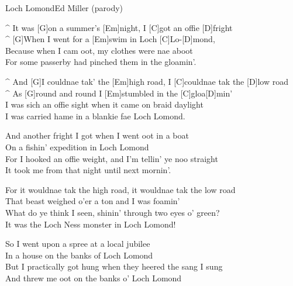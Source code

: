 \vspace{-5mm}
\begin{song}{Loch Lomond}{Ed Miller (parody)}

\vspace{-5mm}
\begin{guitar}
^ It was [G]on a summer's [Em]night, I [C]got an offie [D]fright\\
^ [G]When I went for a [Em]swim in Loch [C]Lo-[D]mond,\\
Because when I cam oot, my clothes were nae aboot\\
For some passerby had pinched them in the gloamin'.\\
\end{guitar}

\begin{guitar}
^ And [G]I couldnae tak' the [Em]high road, I [C]couldnae tak the [D]low road\\
^ As [G]round and round I [Em]stumbled in the [C]gloa[D]min'\\
I was sich an offie sight when it came on braid daylight\\
I was carried hame in a blankie fae Loch Lomond.\\
\end{guitar}


\begin{guitar}
And another fright I got when I went oot in a boat\\
On a fishin' expedition in Loch Lomond\\
For I hooked an offie weight, and I'm tellin' ye noo straight\\
It took me from that night until next mornin'.\\
\end{guitar}

\begin{guitar}
For it wouldnae tak the high road, it wouldnae tak the low road\\
That beast weighed o'er a ton and I was foamin'\\
What do ye think I seen, shinin' through two eyes o' green?\\
It was the Loch Ness monster in Loch Lomond!\\
\end{guitar}


\begin{guitar}
So I went upon a spree at a local jubilee\\
In a house on the banks of Loch Lomond\\
But I practically got hung when they heered the sang I sung\\
And threw me oot on the banks o' Loch Lomond\\
\end{guitar}


\end{song}
